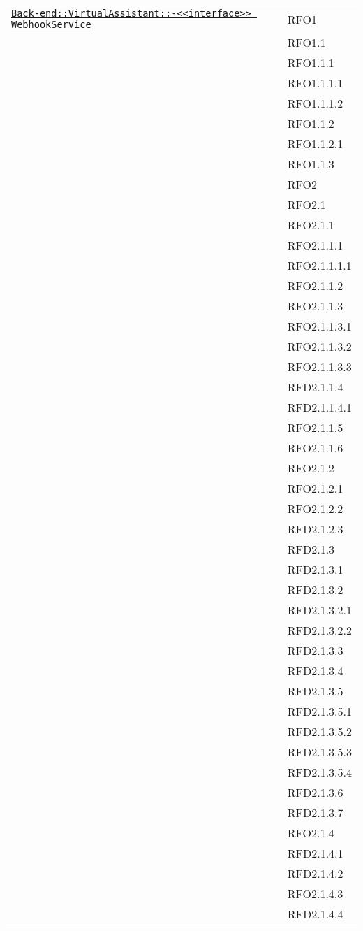 \begin{longtable}{|>{\centering}m{10cm}|m{3cm}<{\centering}|}
\hyperref[Back-end::VirtualAssistant::<<interface>> WebhookService]{\texttt{Back-end::VirtualAssistant::-\linebreak <<interface>> WebhookService}} & RFO1\\
& RFO1.1\\
& RFO1.1.1\\
& RFO1.1.1.1\\
& RFO1.1.1.2\\
& RFO1.1.2\\
& RFO1.1.2.1\\
& RFO1.1.3\\
& RFO2\\
& RFO2.1\\
& RFO2.1.1\\
& RFO2.1.1.1\\
& RFO2.1.1.1.1\\
& RFO2.1.1.2\\
& RFO2.1.1.3\\
& RFO2.1.1.3.1\\
& RFO2.1.1.3.2\\
& RFO2.1.1.3.3\\
& RFD2.1.1.4\\
& RFD2.1.1.4.1\\
& RFO2.1.1.5\\
& RFO2.1.1.6\\
& RFO2.1.2\\
& RFO2.1.2.1\\
& RFO2.1.2.2\\
& RFD2.1.2.3\\
& RFD2.1.3\\
& RFD2.1.3.1\\
& RFD2.1.3.2\\
& RFD2.1.3.2.1\\
& RFD2.1.3.2.2\\
& RFD2.1.3.3\\
& RFD2.1.3.4\\
& RFD2.1.3.5\\
& RFD2.1.3.5.1\\
& RFD2.1.3.5.2\\
& RFD2.1.3.5.3\\
& RFD2.1.3.5.4\\
& RFD2.1.3.6\\
& RFD2.1.3.7\\
& RFO2.1.4\\
& RFD2.1.4.1\\
& RFD2.1.4.2\\
& RFO2.1.4.3\\
& RFD2.1.4.4\\

\end{longtable}
